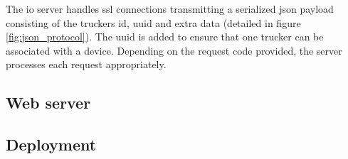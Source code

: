 The \Ac{io} server handles \ac{ssl} connections transmitting a serialized \ac{json} payload consisting of the truckers \ac{id}, \ac{uuid} and extra data (detailed in figure \ref{fig:json_protocol}).
The \ac{uuid} is added to ensure that one trucker can be associated with a device.
Depending on the request code provided, the server processes each request appropriately.



\subsection{Web server}


\subsection{Deployment}

\pagebreak
